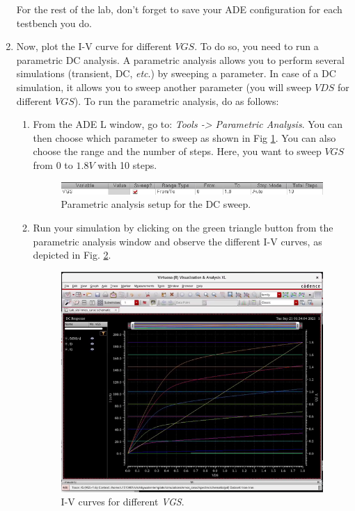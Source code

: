 \begin{enumerate}
	
	\begin{warning}
		For the rest of the lab, don't forget to save your ADE configuration for each testbench you do. 
	\end{warning}
	
	\item Now, plot the I-V curve for different $VGS$. To do so, you need to run a parametric DC analysis. A parametric analysis allows you to perform several simulations (transient, DC, \textit{etc}.) by sweeping a parameter. In case of a DC simulation, it allows you to sweep another parameter (you will sweep $VDS$ for different $VGS$). To run the parametric analysis, do as follows:
	\begin{enumerate}
		\item From the ADE L window, go to: \textit{Tools -> Parametric Analysis}. You can then choose which parameter to sweep as shown in Fig \ref{fig_paramsweep}. You can also choose the range and the number of steps. Here, you want to sweep $VGS$ from $0$ to $1.8V$ with 10 steps.
		
		\begin{figure}[!h]
			\centering
			\includegraphics[scale=0.6]{figures/lab1_schematic_sim/paramsweep}
			\caption{Parametric analysis setup for the DC sweep.}
			\label{fig_paramsweep}
		\end{figure}
		
		\item Run your simulation by clicking on the green triangle button from the parametric analysis window and observe the different I-V curves, as depicted in Fig. \ref{fig_paramcurve}.
		
		\begin{figure}[!h]
			\centering
			\includegraphics[scale=0.35]{figures/lab1_schematic_sim/parametric_curve}
			\caption{I-V curves for different \textit{VGS}.}
			\label{fig_paramcurve}
		\end{figure}
	\end{enumerate}
	

\end{enumerate}
